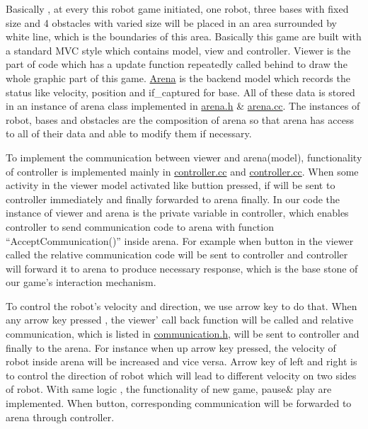 Basically , at every this robot game initiated, one robot, three bases with fixed size and 4 obstacles with varied size will be placed in an area surrounded by white line, which is the boundaries of this area. Basically this game are built with a standard M\+VC style which contains model, view and controller. Viewer is the part of code which has a update function repeatedly called behind to draw the whole graphic part of this game. \hyperlink{classArena}{Arena} is the backend model which records the status like velocity, position and if\+\_\+captured for base. All of these data is stored in an instance of arena class implemented in \hyperlink{arena_8h}{arena.\+h} \& \hyperlink{arena_8cc}{arena.\+cc}. The instances of robot, bases and obstacles are the composition of arena so that arena has access to all of their data and able to modify them if necessary.

To implement the communication between viewer and arena(model), functionality of controller is implemented mainly in \hyperlink{controller_8cc}{controller.\+cc} and \hyperlink{controller_8cc}{controller.\+cc}. When some activity in the viewer model activated like buttion pressed, if will be sent to controller immediately and finally forwarded to arena finally. In our code the instance of viewer and arena is the private variable in controller, which enables controller to send communication code to arena with function “\+Accept\+Communication()” inside arena. For example when button in the viewer called the relative communication code will be sent to controller and controller will forward it to arena to produce necessary response, which is the base stone of our game’s interaction mechanism.

To control the robot’s velocity and direction, we use arrow key to do that. When any arrow key pressed , the viewer’ call back function will be called and relative communication, which is listed in \hyperlink{communication_8h}{communication.\+h}, will be sent to controller and finally to the arena. For instance when up arrow key pressed, the velocity of robot inside arena will be increased and vice versa. Arrow key of left and right is to control the direction of robot which will lead to different velocity on two sides of robot. With same logic , the functionality of new game, pause\& play are implemented. When button, corresponding communication will be forwarded to arena through controller.

